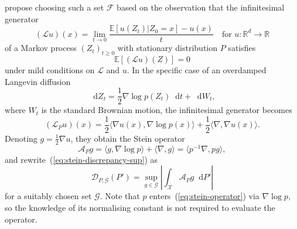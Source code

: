 \documentclass[11pt,a4paper]{report}
\newcommand*\diff{\mathop{}\!\mathrm{d}}
\begin{document}
\cite{gorhamMeasuringSampleQuality2015} propose choosing such a set $\mathcal{F}$ based on the observation that the infinitesimal generator
$$(\mathcal{L}u)(x) = \lim_{t \to 0} \frac{\mathbb{E}[u(Z_t) | Z_0 = x] - u(x)}{t} \quad \text{for } u:\mathbb{R}^d \to \mathbb{R}$$
of a Markov process $(Z_t)_{t \geq 0}$ with stationary distribution $P$ satisfies 
$$\mathbb{E}[(\mathcal{L} u)(Z)] = 0$$
under mild conditions on $\mathcal{L}$ and $u$. In the specific case of an overdamped Langevin diffusion
$$\diff Z_t = \frac{1}{2} \nabla \log p(Z_t) \diff t + \diff W_t,$$
where $W_t$ is the standard Brownian motion, the infinitesimal generator becomes
$$(\mathcal{L}_P u)(x) = \frac{1}{2} \langle \nabla u(x), \nabla \log p(x)\rangle + \frac{1}{2}\langle \nabla, \nabla u(x) \rangle.$$
Denoting $g  = \frac{1}{2}\nabla u$, they obtain the Stein operator
\begin{equation}
\mathcal{A}_P g = \langle g, \nabla \log p \rangle + \langle \nabla, g \rangle = \langle p^{-1}\nabla, p g \rangle,
\label{eq:stein-operator}
\end{equation}
and rewrite~(\ref{eq:stein-discrepancy-sup}) as
\begin{equation}
\mathcal{D}_{P, \mathcal{G}}(P') = \sup_{g \in \mathcal{G}}\left|\int_\mathcal{X} \mathcal{A}_P g \diff P' \right|
\label{eq:stein-discrepancy-g}
\end{equation}
for a suitably chosen set $\mathcal{G}$. Note that $p$ enters~(\ref{eq:stein-operator}) via $\nabla \log p$, so the knowledge of its normalising constant is not required to evaluate the operator.
\end{document}
